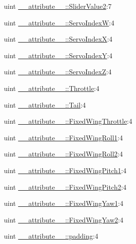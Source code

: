 \begin{DoxyCompactItemize}
uint \hyperlink{group___config_plugin_ga86cc56b0247155cf5d5ef0e31d509fed}{\-\_\-\-\_\-attribute\-\_\-\-\_\-\-::\-Slider\-Value2}\-:7
\item 
uint \hyperlink{group___config_plugin_gaffe6aa75cde814b5068ce3494b2abb34}{\-\_\-\-\_\-attribute\-\_\-\-\_\-\-::\-Servo\-Index\-W}\-:4
\item 
uint \hyperlink{group___config_plugin_ga0d592171bd6f7381c2a33dfed5f7c40d}{\-\_\-\-\_\-attribute\-\_\-\-\_\-\-::\-Servo\-Index\-X}\-:4
\item 
uint \hyperlink{group___config_plugin_ga517baa5d4109f802400efeb8a5897b1b}{\-\_\-\-\_\-attribute\-\_\-\-\_\-\-::\-Servo\-Index\-Y}\-:4
\item 
uint \hyperlink{group___config_plugin_ga661c3e27f6844865ea7244fa1363516e}{\-\_\-\-\_\-attribute\-\_\-\-\_\-\-::\-Servo\-Index\-Z}\-:4
\item 
uint \hyperlink{group___config_plugin_ga5045493288e2ee044c68dafe0a02b05c}{\-\_\-\-\_\-attribute\-\_\-\-\_\-\-::\-Throttle}\-:4
\item 
uint \hyperlink{group___config_plugin_ga904a0b19b372c87ddf027435cd9e7723}{\-\_\-\-\_\-attribute\-\_\-\-\_\-\-::\-Tail}\-:4
\item 
uint \hyperlink{group___config_plugin_ga2c5e7e1c1622df1735c63b2a700b1f30}{\-\_\-\-\_\-attribute\-\_\-\-\_\-\-::\-Fixed\-Wing\-Throttle}\-:4
\item 
uint \hyperlink{group___config_plugin_ga674f11a566247fc5041091e940c5d679}{\-\_\-\-\_\-attribute\-\_\-\-\_\-\-::\-Fixed\-Wing\-Roll1}\-:4
\item 
uint \hyperlink{group___config_plugin_ga1d932ff664060c5dd74bb8ec48b4d8ff}{\-\_\-\-\_\-attribute\-\_\-\-\_\-\-::\-Fixed\-Wing\-Roll2}\-:4
\item 
uint \hyperlink{group___config_plugin_ga13162fedce809405cef3920e6e81a8bc}{\-\_\-\-\_\-attribute\-\_\-\-\_\-\-::\-Fixed\-Wing\-Pitch1}\-:4
\item 
uint \hyperlink{group___config_plugin_gaeef8404a3e1d41f57ce18b8e9b351a2d}{\-\_\-\-\_\-attribute\-\_\-\-\_\-\-::\-Fixed\-Wing\-Pitch2}\-:4
\item 
uint \hyperlink{group___config_plugin_ga8282dac2550d491034ca0e0fa8f09c0d}{\-\_\-\-\_\-attribute\-\_\-\-\_\-\-::\-Fixed\-Wing\-Yaw1}\-:4
\item 
uint \hyperlink{group___config_plugin_ga0f87bb28c2fe43ab7616b7322ac21106}{\-\_\-\-\_\-attribute\-\_\-\-\_\-\-::\-Fixed\-Wing\-Yaw2}\-:4
\item 
uint \hyperlink{group___config_plugin_gae439ab85c005f3400498997049fd50e8}{\-\_\-\-\_\-attribute\-\_\-\-\_\-\-::padding}\-:4

\end{DoxyCompactItemize}
